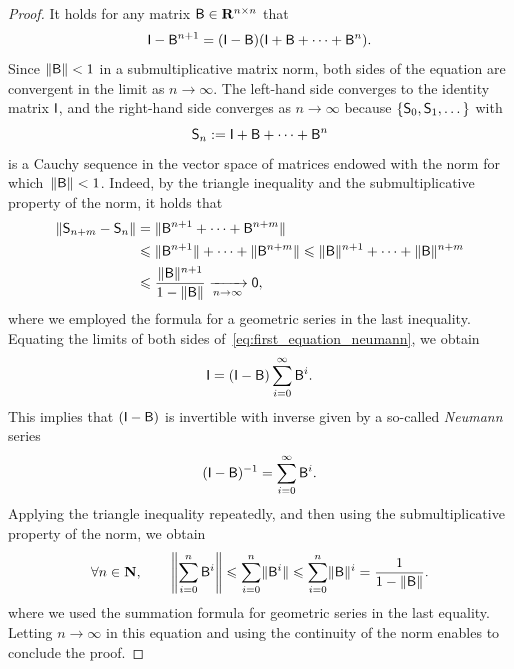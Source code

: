 \begin{proof}
    It holds for any matrix $\mat B \in \real^{n \times n}$ that
    \begin{equation}
        \label{eq:first_equation_neumann}
        \mat I - \mat B^{n+1} = (\mat I - \mat B)(\mat I + \mat B + \dotsb + \mat B^n).
    \end{equation}
    Since $\norm{\mat B} < 1$ in a submultiplicative matrix norm,
    both sides of the equation are convergent in the limit as $n \to \infty$.
    The left-hand side converges to the identity matrix $\mat I$,
    and the right-hand side converges as $n \to \infty$ because $\{\mat S_0, \mat S_1, \dotsc\}$ with
    \[
        \mat S_n := \mat I + \mat B + \dotsb + \mat B^n
    \]
    is a Cauchy sequence in the vector space of matrices endowed with the norm for which~$\norm{\mat B} < 1$.
    Indeed, by the triangle inequality and the submultiplicative property of the norm,
    it holds that
    \begin{align*}
        \norm{\mat S_{n+m} - \mat S_n}
        &= \norm{\mat B^{n+1} + \dotsb + \mat B^{n+m}} \\
        &\leq \norm{\mat B^{n+1}} + \dotsb + \norm{\mat B^{n+m}}
        \leq \norm{\mat B}^{n+1} + \dotsb + \norm{\mat B}^{n+m} \\
        &\leq  \frac{\norm{\mat B}^{n+1}}{1 - \norm{\mat B}} \xrightarrow[n \to \infty]{} \mat 0,
    \end{align*}
    where we employed the formula for a geometric series in the last inequality.
    Equating the limits of both sides of~\eqref{eq:first_equation_neumann},
    we obtain
    \[
        \mat I = (\mat I - \mat B) \sum_{i=0}^{\infty} \mat B^i.
    \]
    This implies that $(\mat I - \mat B)$ is invertible with inverse
    given by a so-called \emph{Neumann} series
    \begin{equation*}
        (\mat I - \mat B)^{-1} = \sum_{i=0}^{\infty} \mat B^i.
    \end{equation*}
    Applying the triangle inequality repeatedly,
    and then using the submultiplicative property of the norm,
    we obtain
    \[
        \forall n \in \nat,
        \qquad
        \norm*{\sum_{i=0}^{n} \mat B^i}
        \leq \sum_{i=0}^{n} \norm{\mat B^i}
        \leq \sum_{i=0}^{n} \norm{\mat B}^i
        = \frac{1}{1 - \norm{\mat B}}.
    \]
    where we used the summation formula for geometric series in the last equality.
    Letting $n \to \infty$ in this equation and
    using the continuity of the norm enables to conclude the proof.
\end{proof}

